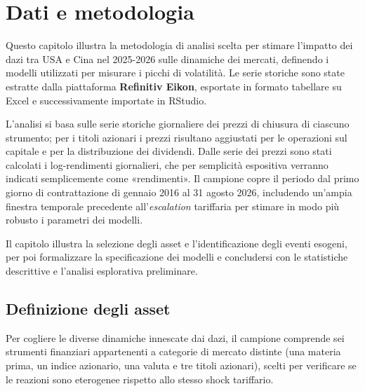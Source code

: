 \chapter{Dati e metodologia}
\label{cap:dati-metodologia}

Questo capitolo illustra la metodologia di analisi scelta per stimare l'impatto dei dazi tra USA e Cina nel 2025-2026 sulle dinamiche dei mercati, definendo i modelli 
utilizzati per misurare i picchi di volatilità. Le serie storiche sono state estratte dalla piattaforma \textbf{Refinitiv Eikon}, esportate in formato tabellare su Excel 
e successivamente importate in RStudio.

L'analisi si basa sulle serie storiche giornaliere dei prezzi di chiusura di ciascuno strumento; per i titoli azionari i prezzi risultano aggiustati per le operazioni 
sul capitale e per la distribuzione dei dividendi. Dalle serie dei prezzi sono stati calcolati i log-rendimenti giornalieri, che per semplicità espositiva verranno indicati 
semplicemente come «rendimenti». Il campione copre il periodo dal primo giorno di contrattazione di gennaio 2016 al 31 agosto 2026, includendo un'ampia finestra 
temporale precedente all'\emph{escalation} tariffaria per stimare in modo più robusto i parametri dei modelli.

Il capitolo illustra la selezione degli asset e l'identificazione degli eventi esogeni, per poi formalizzare la specificazione dei modelli e concludersi con le 
statistiche descrittive e l'analisi esplorativa preliminare.


\section{Definizione degli asset}
\label{sec:definizione_asset}
Per cogliere le diverse dinamiche innescate dai dazi, il campione comprende sei strumenti finanziari appartenenti a categorie di mercato distinte 
(una materia prima, un indice azionario, una valuta e tre titoli azionari), scelti per verificare se le reazioni sono eterogenee rispetto allo stesso shock tariffario.

